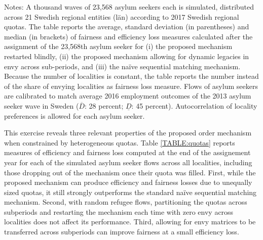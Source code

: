 \documentclass[12pt,fleqn]{article}
\begin{document}
\begin{table}
\caption{ Performance of the assignment algorithm if quotas are split over multiple sub-periods}
\label{TABLE:quotas}
	{\scriptsize \vspace{0.1em}
	\begin{singlespace}
		{\sc Notes:} A thousand waves of 23,568 asylum seekers each is simulated, distributed across 21 Swedish regional entities (l\"{a}n) according to 2017 Swedish regional quotas. The table reports the average, standard deviation (in parentheses) and median (in brackets) of fairness and efficiency loss measures calculated after the assignment of the 23,568th asylum seeker for (i) the proposed mechanism restarted blindly, (ii) the proposed mechanism allowing for dynamic legacies in envy across sub-periods, and (iii) the na\"{i}ve sequential matching mechanism. Because the number of localities is constant, the table reports the number instead of the share of envying localities as fairness loss measure. Flows of asylum seekers are calibrated to match average 2016 employment outcomes of the 2013 asylum seeker wave in Sweden ($\overline{D}$: 28 percent; $\underline{D}$: 45 percent). Autocorrelation of locality preferences is allowed for each asylum seeker.
	\end{singlespace}
	 }
	\end{table}

This exercise reveals three relevant properties of the proposed order mechanism when constrained by heterogeneous quotas. Table \ref{TABLE:quotas} reports measures of efficiency and fairness loss computed at the end of the assignement year for each of the simulated asylum seeker flows across all localities, including those dropping out of the mechanism once their quota was filled. First, while the proposed mechanism can produce efficiency and fairness losses due to unequally sized quotas, it still strongly outperforms the standard na\"{i}ve sequential matching mechanism. Second, with random refugee flows, partitioning the quotas across subperiods and restarting the mechanism each time with zero envy across localities does not affect its performance. Third, allowing for envy matrices to be transferred across subperiods can improve fairness at a small efficiency loss.
\end{document}
